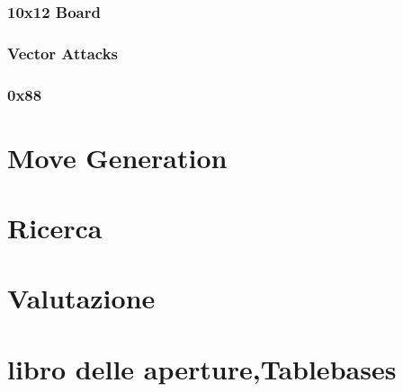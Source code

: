 \subsubsection{10x12 Board}
\subsubsection{Vector Attacks}
\subsubsection{0x88}





\section{Move Generation} %


\section{Ricerca} %

\section{Valutazione} %

\section{libro delle aperture,Tablebases} %

